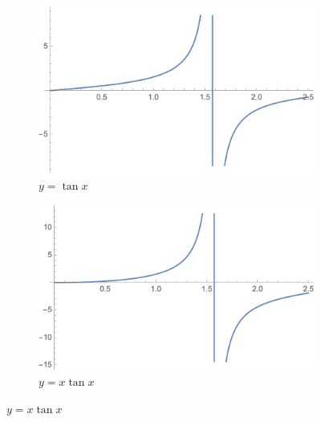         \begin{figure}[H]
            \centering
            \begin{subfigure}{0.48\textwidth}
                    
                \centering
                \includegraphics[scale=0.4]{tanx.png}
                \caption{$y=\tan{x}$}
                
            \end{subfigure}
            \begin{subfigure}{0.48\textwidth}
                
                \centering
                \includegraphics[scale=0.4]{xtanx.png}
                \caption{$y=x \tan{x}$}

            \end{subfigure}
              
        \end{figure}


